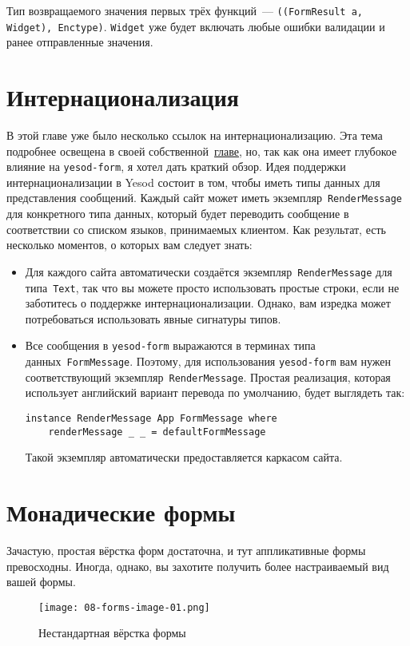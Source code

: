 Тип возвращаемого значения первых трёх функций~---
\lstinline'((FormResult a, Widget), Enctype)'.  \lstinline'Widget' уже будет
включать любые ошибки валидации и ранее отправленные значения.

\section{Интернационализация}
В этой главе уже было несколько ссылок на интернационализацию. Эта тема
подробнее освещена в своей собственной~\hyperref[chap:i18n]{главе}, но, так как
она имеет глубокое влияние на \lstinline'yesod-form', я хотел дать краткий обзор.
Идея поддержки интернационализации в Yesod состоит в том, чтобы иметь
типы данных для представления сообщений. Каждый сайт может иметь
экземпляр~\lstinline'RenderMessage' для конкретного типа данных, который будет
переводить сообщение в соответствии со списком языков, принимаемых клиентом.
Как результат, есть несколько моментов, о которых вам следует знать:
\begin{itemize}
    \item  Для каждого сайта автоматически создаётся
        экземпляр~\lstinline'RenderMessage' для типа~\lstinline'Text', так что
        вы можете просто использовать простые строки, если не заботитесь о
        поддержке интернационализации. Однако, вам изредка может потребоваться
        использовать явные сигнатуры типов.

    \item Все сообщения в \lstinline'yesod-form' выражаются в терминах типа
        данных~\lstinline'FormMessage'.  Поэтому, для использования \lstinline'yesod-form'
        вам нужен соответствующий экземпляр~\lstinline'RenderMessage'. Простая
        реализация, которая использует английский вариант перевода по
        умолчанию, будет выглядеть так:
\begin{lstlisting}
instance RenderMessage App FormMessage where
    renderMessage _ _ = defaultFormMessage
\end{lstlisting}
        Такой экземпляр автоматически предоставляется каркасом сайта.
\end{itemize}

\section{Монадические формы}
Зачастую, простая вёрстка форм достаточна, и тут аппликативные формы
превосходны. Иногда, однако, вы захотите получить более настраиваемый вид вашей
формы.
\begin{figure}[tbph]
  \centering
  \texttt{[image: 08-forms-image-01.png]}
  \caption{Нестандартная вёрстка формы}
\end{figure}

